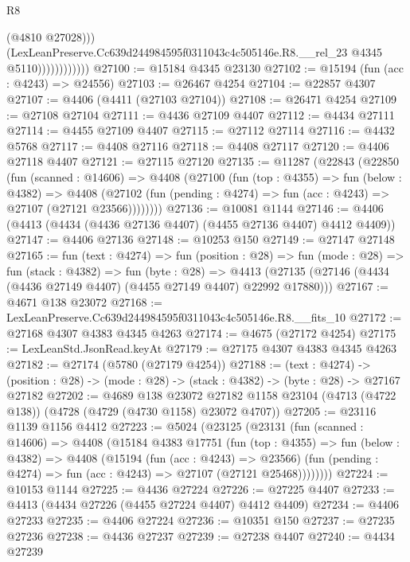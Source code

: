 \begin{lexlean}{R8}
\begin{coremodule}
                              (@4810 @27028)))
                          (LexLeanPreserve.Cc639d244984595f0311043c4c505146e.R8.__rel_23
                            @4345
                            @5110))))))))))))
@27100 := @15184 @4345 @23130
@27102 := @15194 (fun (acc : @4243) => @24556)
@27103 := @26467 @4254
@27104 := @22857 @4307
@27107 := @4406 (@4411 (@27103 @27104))
@27108 := @26471 @4254
@27109 := @27108 @27104
@27111 := @4436 @27109 @4407
@27112 := @4434 @27111
@27114 := @4455 @27109 @4407
@27115 := @27112 @27114
@27116 := @4432 @5768
@27117 := @4408 @27116
@27118 := @4408 @27117
@27120 := @4406 @27118 @4407
@27121 := @27115 @27120
@27135 := @11287
    (@22843
      (@22850
        (fun (scanned : @14606) =>
        @4408
          (@27100
            (fun (top : @4355) =>
            fun (below : @4382) =>
            @4408
              (@27102 (fun (pending : @4274) => fun (acc : @4243) => @27107 (@27121 @23566))))))))
@27136 := @10081 @1144
@27146 := @4406 (@4413 (@4434 (@4436 @27136 @4407) (@4455 @27136 @4407) @4412 @4409))
@27147 := @4406 @27136
@27148 := @10253 @150
@27149 := @27147 @27148
@27165 := fun (text : @4274) =>
  fun (position : @28) =>
  fun (mode : @28) =>
  fun (stack : @4382) =>
  fun (byte : @28) =>
  @4413 (@27135 (@27146 (@4434 (@4436 @27149 @4407) (@4455 @27149 @4407) @22992 @17880)))
@27167 := @4671 @138 @23072
@27168 := LexLeanPreserve.Cc639d244984595f0311043c4c505146e.R8.__fits_10
@27172 := @27168 @4307 @4383 @4345 @4263
@27174 := @4675 (@27172 @4254)
@27175 := LexLeanStd.JsonRead.keyAt
@27179 := @27175 @4307 @4383 @4345 @4263
@27182 := @27174 (@5780 (@27179 @4254))
@27188 := (text : @4274) ->
  (position : @28) -> (mode : @28) -> (stack : @4382) -> (byte : @28) -> @27167 @27182
@27202 := @4689
    @138
    @23072
    @27182
    @1158
    @23104
    (@4713 (@4722 @138))
    (@4728 (@4729 (@4730 @1158) @23072 @4707))
@27205 := @23116 @1139 @1156 @4412
@27223 := @5024
    (@23125
      (@23131
        (fun (scanned : @14606) =>
        @4408
          (@15184
            @4383
            @17751
            (fun (top : @4355) =>
            fun (below : @4382) =>
            @4408
              (@15194
                (fun (acc : @4243) => @23566)
                (fun (pending : @4274) => fun (acc : @4243) => @27107 (@27121 @25468))))))))
@27224 := @10153 @1144
@27225 := @4436 @27224
@27226 := @27225 @4407
@27233 := @4413 (@4434 @27226 (@4455 @27224 @4407) @4412 @4409)
@27234 := @4406 @27233
@27235 := @4406 @27224
@27236 := @10351 @150
@27237 := @27235 @27236
@27238 := @4436 @27237
@27239 := @27238 @4407
@27240 := @4434 @27239

\end{coremodule}
\end{lexlean}
